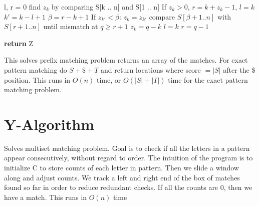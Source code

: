 \documentclass[10pt]{article}
\begin{document}
\begin{algorithm}[H]
    \begin{algorithmic}[1]
    \tiny
    
        \State l, r = 0
                \State find $z_k$ by comparing S[k .. n] and S[1 .. n]
                \State If $z_k > 0$, $r = k + z_k - 1$, $l = k$
            \Else
                \State $k' = k - l + 1$
                \State $\beta = r - k + 1$
                \State If $z_{k'} < \beta$: $z_k = z_{k'}$
                    \State compare $S[\beta + 1 .. n]$ with $S[r+1 .. n]$ until mismatch at $q \geq r + 1$
                    \State $z_k = q-k$
                    \State $l = k$
                    \State $r = q-1$
                \EndIf
            \EndIf
        \EndFor

    \State \textbf{return} Z
    
    \EndFunction
    \end{algorithmic}
\end{algorithm}

This solves prefix matching problem returns an array of the matches.
For exact pattern matching do $S + \$ + T$ and return locations where score $= |S|$ after the \$ position.
This runs in $O(n)$ time, or $O(|S| + |T|)$ time for the exact pattern matching problem.

\section{Y-Algorithm}
Solves multiset matching problem. 
Goal is to check if all the letters in a pattern appear consecutively, without regard to order.
The intuition of the program is to initialize C to store counts of each letter in pattern.
Then we slide a window along and adjust counts.
We track a left and right end of the box of matches found so far in order to reduce redundant checks.
If all the counts are 0, then we have a match.
This runs in $O(n)$ time
\end{document}
